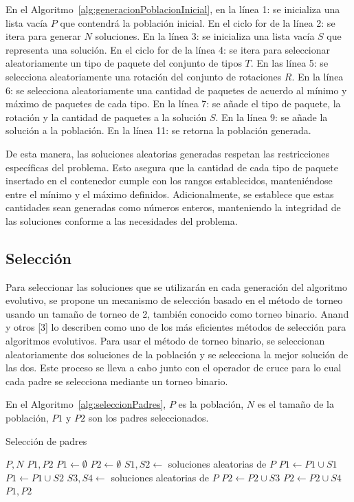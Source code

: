 \documentclass[openany]{article}
\begin{document}
En el Algoritmo~\ref{alg:generacionPoblacionInicial}, en la línea 1: se inicializa una lista vacía $P$ que contendrá la población inicial. En el ciclo for de la línea 2: se itera para generar $N$ soluciones. En la línea 3: se inicializa una lista vacía $S$ que representa una solución. En el ciclo for de la línea 4: se itera para seleccionar aleatoriamente un tipo de paquete del conjunto de tipos $T$. En las línea 5: se selecciona aleatoriamente una rotación del conjunto de rotaciones $R$. En la línea 6: se selecciona aleatoriamente una cantidad de paquetes de acuerdo al mínimo y máximo de paquetes de cada tipo. En la línea 7: se añade el tipo de paquete, la rotación y la cantidad de paquetes a la solución $S$. En la línea 9: se añade la solución a la población. En la línea 11: se retorna la población generada.

De esta manera, las soluciones aleatorias generadas respetan las restricciones específicas del problema. Esto asegura que la cantidad de cada tipo de paquete insertado en el contenedor cumple con los rangos establecidos, manteniéndose entre el mínimo y el máximo definidos. Adicionalmente, se establece que estas cantidades sean generadas como números enteros, manteniendo la integridad de las soluciones conforme a las necesidades del problema.

\subsection{Selección}

Para seleccionar las soluciones que se utilizarán en cada generación del algoritmo evolutivo, se propone un mecanismo de selección basado en el método de torneo usando un tamaño de torneo de 2, también conocido como torneo binario. Anand y otros [3] lo describen como uno de los más eficientes métodos de selección para algoritmos evolutivos. Para usar el método de torneo binario, se seleccionan aleatoriamente dos soluciones de la población y se selecciona la mejor solución de las dos. Este proceso se lleva a cabo junto con el operador de cruce para lo cual cada padre se selecciona mediante un torneo binario.

En el Algoritmo~\ref{alg:seleccionPadres}, $P$ es la población, $N$ es el tamaño de la población, $P1$ y $P2$ son los padres seleccionados.

\begin{algorithm}[H]
    \caption{Selección de padres}\label{alg:seleccionPadres}
    \begin{algorithmic}[1]
        \Require $P, N$
        \Ensure $P1, P2$
        \State $P1 \leftarrow \emptyset$
        \State $P2 \leftarrow \emptyset$
        \State $S1, S2 \leftarrow$ soluciones aleatorias de $P$
        \State $P1 \leftarrow P1 \cup S1$
        \Else
        \State $P1 \leftarrow P1 \cup S2$
        \EndIf
        \State $S3, S4 \leftarrow$ soluciones aleatorias de $P$
        \State $P2 \leftarrow P2 \cup S3$
        \Else
        \State $P2 \leftarrow P2 \cup S4$
        \EndIf
        \EndFor
        \State \Return $P1, P2$
    \end{algorithmic}
\end{algorithm}
\end{document}

